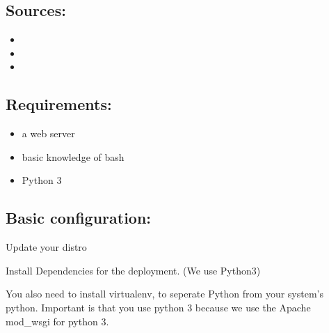 \documentclass[letterpaper,10pt,english]{sphinxmanual}
\begin{document}
\subsection{Sources:}
\label{\detokenize{masterAdminDoc:sources}}\begin{itemize}
\item {} 

\item {} 

\item {} 

\end{itemize}


\subsection{Requirements:}
\label{\detokenize{masterAdminDoc:requirements}}\begin{itemize}
\item {} 
a web server

\item {} 
basic knowledge of bash

\item {} 
Python 3

\end{itemize}


\subsection{Basic configuration:}
\label{\detokenize{masterAdminDoc:basic-configuration}}
Update your distro
\begin{quote}

\end{quote}

Install Dependencies for the deployment. (We use Python3)
\begin{quote}

\end{quote}

You also need to install virtualenv, to seperate Python from your system’s python.
Important is that you use python 3 because we use the Apache mod\_wsgi for
python 3.
\begin{quote}

\end{quote}
\end{document}
